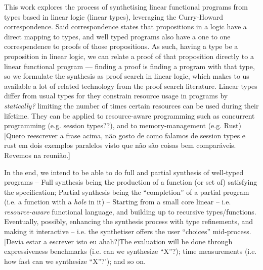 \documentclass{llncs}
\begin{document}
This work explores the process of synthetising linear functional
 programs from types based in linear logic (linear types), leveraging the Curry-Howard correspondence.
Said correspondence states that propositions in a logic have a direct mapping to types,
 and well typed programs also have a one to one correspendence to proofs of those propositions.
As such, having a type be a proposition in linear logic, we can relate a proof of that
 proposition directly to a linear functional program
 — finding a proof is finding a program with that type, so we
 formulate the synthesis as proof search in linear logic, which makes to us available
 a lot of related technology from the proof search literature.
Linear types differ from usual types for they constrain resource usage in programs by
 \emph{statically?} limiting the number of times certain resources can be used during their lifetime.
 They can be applied to resource-aware programming such as concurrent programming (e.g. session types??), and to memory-management (e.g. Rust)
 [Quero reescrever a frase acima, não gosto de como falamos de session types e rust em dois exemplos paralelos visto que não são coisas bem comparáveis. Revemos na reunião.]
 
In the end, we intend to be able to do full and partial synthesis of well-typed programs --
 Full synthesis being the production of a function (or set of) satisfying the specification;
 Partial synthesis being the ``completion'' of a partial program (i.e. a function with a \emph{hole} in it) --
 Starting from a small core linear -- i.e. \emph{resource-aware} functional language, and building up to recursive types/functions.
 Eventually, possibly, enhancing the synthesis process with type refinements, and making it interactive -- i.e. the synthetiser offers the user
 ``choices'' mid-process.
[Devia estar a escrever isto eu ahah?]The evaluation will be done through expressiveness
benchmarks (i.e. can we synthesize ``X''?); time measurements (i.e. how fast can we synthesize ``X''?'); and so on.
\end{document}
